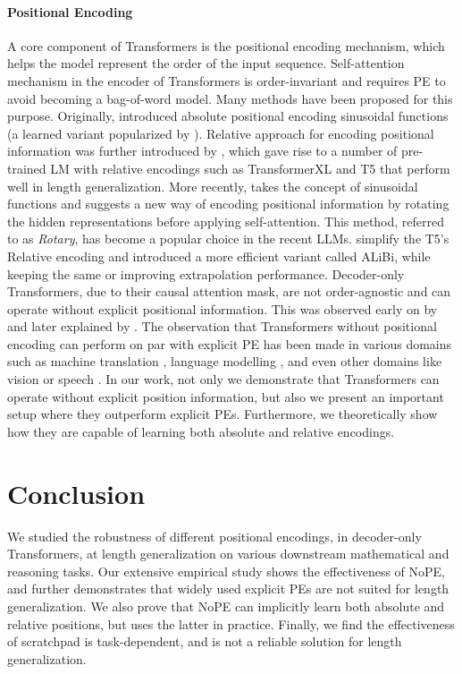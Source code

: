 \documentclass{article}
\begin{document}
\paragraph{Positional Encoding}
A core component of Transformers is the positional encoding mechanism, which helps the model represent the order of the input sequence.
Self-attention mechanism in the encoder of Transformers is order-invariant and requires PE to avoid becoming a bag-of-word model.
Many methods have been proposed for this purpose.
Originally, \citet{Vaswani2017:Transformer} introduced absolute positional encoding sinusoidal functions (a learned variant popularized by \citet{Devlin2019:BERT}).
Relative approach for encoding positional information was further introduced by \citet{Shaw2018:RelativePosEnc}, which gave rise to a number of pre-trained LM with relative encodings such as TransformerXL \citep{Dai2019:TransformerXL} and T5 \citep{Raffel2020:T5} that perform well in length generalization.
More recently, \citet{Su2021:Rotary} takes the concept of sinusoidal functions and suggests a new way of encoding positional information by rotating the hidden representations before applying self-attention. This method, referred to as \emph{Rotary}, has become a popular choice in the recent LLMs.
\citet{Press2022:ALiBi} simplify the T5's Relative encoding and introduced a more efficient variant called ALiBi, while keeping the same or improving extrapolation performance.
Decoder-only Transformers, due to their causal attention mask, are not order-agnostic and can operate without explicit positional information.
This was observed early on by \citet{Shen2017:DiSelfAttentionNetwork} and later explained by \citet{Tsai2019:TransformerDissection}. The observation that Transformers without positional encoding can perform on par with explicit PE has been made in various domains such as machine translation \citep{Yang2019:SelfAttentionWordOrder}, language modelling \citep{Irie2019:LMwithDeepTransform, Haviv2022:NoPETransformer}, and even other domains like vision or speech \citep{Likhomanenko2021:CAPE}.
In our work, not only we demonstrate that Transformers can operate without explicit position information, but also we present an important setup where they outperform explicit PEs. Furthermore, we theoretically show how they are capable of learning both absolute and relative encodings.

\section{Conclusion}
We studied the robustness of different positional encodings, in decoder-only Transformers, at length generalization on various downstream mathematical and reasoning tasks.
Our extensive empirical study shows the effectiveness of NoPE, and further demonstrates that widely used explicit PEs are not suited for length generalization.
We also prove that NoPE can implicitly learn both absolute and relative positions, but uses the latter in practice.
Finally, we find the effectiveness of scratchpad is task-dependent, and is not a reliable solution for length generalization.
\end{document}
